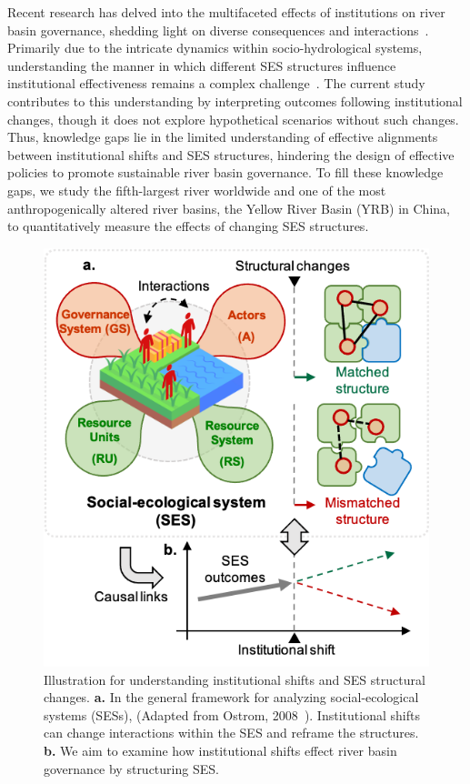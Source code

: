 \documentclass[preprint, 12pt]{elsarticle}
\begin{document}
Recent research has delved into the multifaceted effects of institutions on river basin governance, shedding light on diverse consequences and interactions~\cite{bouckaert2022, vallury2022, loch2020, kirchhoff2016}.
Primarily due to the intricate dynamics within socio-hydrological systems, understanding the manner in which different SES structures influence institutional effectiveness remains a complex challenge~\cite{bodin2017b}.
The current study contributes to this understanding by interpreting outcomes following institutional changes, though it does not explore hypothetical scenarios without such changes.
Thus, knowledge gaps lie in the limited understanding of effective alignments between institutional shifts and SES structures, hindering the design of effective policies to promote sustainable river basin governance.
To fill these knowledge gaps, we study the fifth-largest river worldwide and one of the most anthropogenically altered river basins, the Yellow River Basin (YRB) in China, to quantitatively measure the effects of changing SES structures.

\begin{figure}[!ht]
	\centering
	\includegraphics[width=0.5\linewidth]{diagrams/framework.png}
	\caption{
		Illustration for understanding institutional shifts and SES structural changes. \textbf{a.} In the general framework for analyzing social-ecological systems (SESs), (Adapted from Ostrom, 2008~\cite{ostrom2009}). Institutional shifts can change interactions within the SES and reframe the structures.  \textbf{b.} We aim to examine how institutional shifts effect river basin governance by structuring SES.}\label{fig:framework}
\end{figure}
\end{document}

